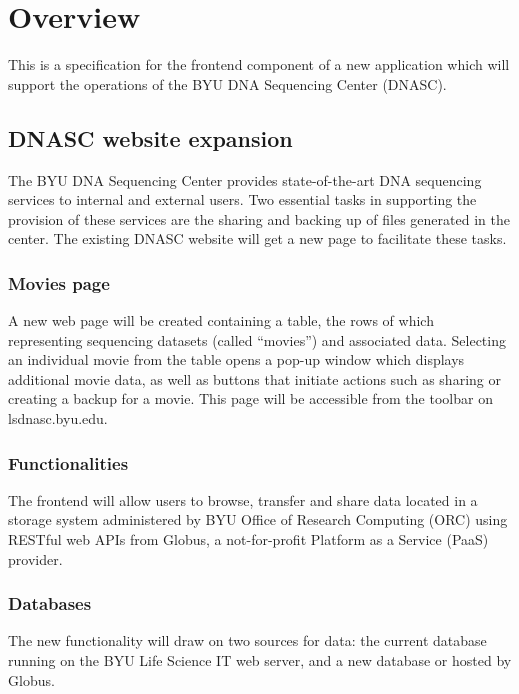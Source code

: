 
\section{Overview}

This is a specification for the frontend component of a new application which will
support the operations of the BYU DNA Sequencing Center (DNASC).

\subsection{DNASC website expansion}

The BYU DNA Sequencing Center provides state-of-the-art DNA sequencing services 
to internal and external users. Two essential tasks in supporting the provision of these 
services are the sharing and backing up of files generated in the center. The existing 
DNASC website  will get a new page to facilitate these tasks.

\subsubsection{Movies page}
A new web page will be created containing a table, the rows of which representing sequencing 
datasets (called ``movies'') and associated data. Selecting an individual movie from the 
table opens a pop-up window which displays additional movie data, as well as buttons that 
initiate actions such as sharing or creating a backup for a movie. This page will be 
accessible from the toolbar on lsdnasc.byu.edu.

\subsubsection{Functionalities}
The frontend will allow users to browse, transfer and share data located in a storage system 
administered by BYU Office of Research Computing (ORC) using RESTful web APIs from 
Globus, a not-for-profit Platform as a Service (PaaS) provider.

\subsubsection{Databases}
The new functionality will draw on two sources for data: the current database running on the 
BYU Life Science IT web server, and a new database or  
hosted by Globus.

